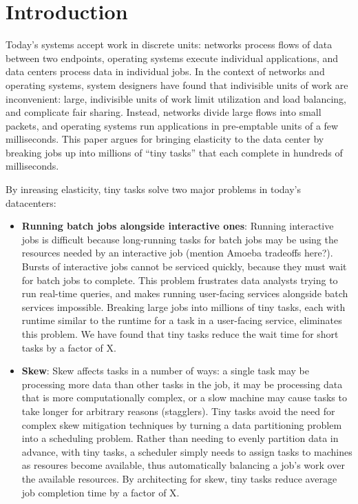\section{Introduction}
Today's systems accept work in discrete units: networks process flows of data
between two endpoints, operating systems execute individual applications, and
data centers process data in individual jobs.  In the context of networks and
operating systems, system designers have found that indivisible units of work are
inconvenient: large, indivisible units of work limit utilization and load balancing,
and complicate fair sharing.  Instead, networks divide large flows into small
packets, and operating systems run applications in pre-emptable units of a 
few milliseconds.  This paper argues for
bringing elasticity to the data center by breaking jobs up into
millions of ``tiny tasks'' that each complete in hundreds of milliseconds.

By inreasing elasticity, tiny tasks solve two major problems in today's datacenters:
\begin{itemize}
\item \textbf{Running batch jobs alongside interactive ones}: Running interactive
jobs is difficult because long-running tasks for batch jobs may be
using the resources needed by an interactive job (mention Amoeba tradeoffs
here?). Bursts of interactive jobs
cannot be serviced quickly, because they must wait for batch jobs to complete.
This problem frustrates data analysts trying to run real-time queries, and makes
running user-facing services alongside batch services impossible. Breaking large
jobs into millions of tiny tasks, each with runtime similar to the runtime for a
task in a user-facing service, eliminates this problem. We have found that
tiny tasks reduce the wait time for short tasks by a factor of X.
\item \textbf{Skew}: Skew affects tasks in a number of ways: a single task
may be processing more data than other tasks in the job, it may be processing
data that is more computationally complex, or a slow machine may cause tasks
to take longer for arbitrary reasons (stagglers). Tiny tasks avoid the need
for complex skew mitigation techniques by turning a data partitioning problem
    into a scheduling problem.  Rather than needing to evenly partition data
    in advance, with tiny tasks, a scheduler simply needs to assign tasks to
    machines as resoures become available, thus automatically balancing a job's
    work over the available resources. By architecting for skew, tiny tasks
    reduce average job completion time by a factor of X.
\end{itemize}


